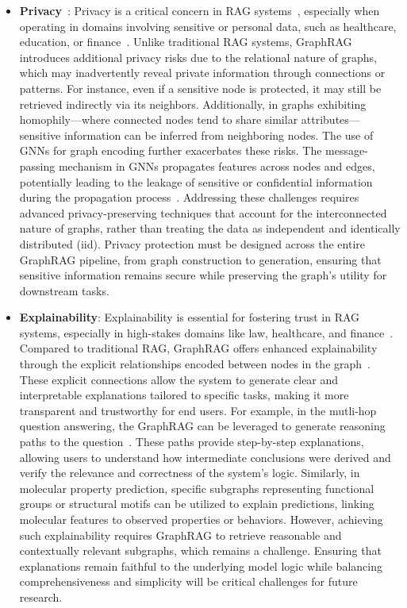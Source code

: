 \begin{itemize}[leftmargin=*]
\begin{itemize}
        \item \textbf{Privacy}~\citep{chen2024survey, zafar2023building, qian2017social}: Privacy is a critical concern in RAG systems~\citep{zeng2024good, zhou2024trustworthiness}, especially when operating in domains involving sensitive or personal data, such as healthcare, education, or finance~\citep{yao2024survey, das2024security, murali2023towards}. Unlike traditional RAG systems, GraphRAG introduces additional privacy risks due to the relational nature of graphs, which may inadvertently reveal private information through connections or patterns. For instance, even if a sensitive node is protected, it may still be retrieved indirectly via its neighbors. Additionally, in graphs exhibiting homophily—where connected nodes tend to share similar attributes—sensitive information can be inferred from neighboring nodes. The use of GNNs for graph encoding further exacerbates these risks. The message-passing mechanism in GNNs propagates features across nodes and edges, potentially leading to the leakage of sensitive or confidential information during the propagation process~\citep{zhang2024survey}.  Addressing these challenges requires advanced privacy-preserving techniques that account for the interconnected nature of graphs, rather than treating the data as independent and identically distributed (iid).  Privacy protection must be designed across the entire GraphRAG pipeline, from graph construction to generation, ensuring that sensitive information remains secure while preserving the graph's utility for downstream tasks.


        \item \textbf{Explainability}: Explainability is essential for fostering trust in RAG systems, especially in high-stakes domains like law, healthcare, and finance~\citep{zhao2024explainability, cambria2024xai, yu2023temporal, elsborg2023using}. Compared to traditional RAG, GraphRAG offers enhanced explainability through the explicit relationships encoded between nodes in the graph~\citep{abu2024supporting}. These explicit connections allow the system to generate clear and interpretable explanations tailored to specific tasks, making it more transparent and trustworthy for end users. For example, in the mutli-hop question answering, the GraphRAG can be leveraged to generate reasoning paths to the question~\citep{luo2023reasoning, keqing, sunthink, jiang2024hykge}. These paths provide step-by-step explanations, allowing users to understand how intermediate conclusions were derived and verify the relevance and correctness of the system’s logic. Similarly, in molecular property prediction, specific subgraphs representing functional groups or structural motifs can be utilized to explain predictions, linking molecular features to observed properties or behaviors. However, achieving such explainability requires GraphRAG to retrieve reasonable and contextually relevant subgraphs, which remains a challenge. Ensuring that explanations remain faithful to the underlying model logic while balancing comprehensiveness and simplicity will be critical challenges for future research. 


\end{itemize}
\end{itemize}
